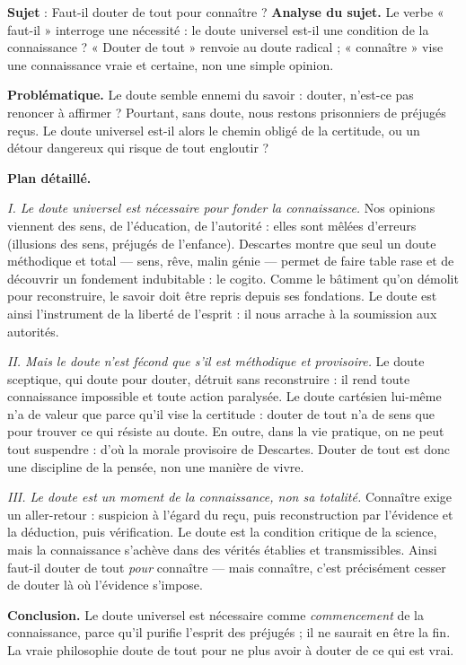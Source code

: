 \documentclass[11pt]{article}
\begin{document}
\begin{exoresolu}
\textbf{Sujet} : Faut-il douter de tout pour connaître ?
\tcblower
\textbf{Analyse du sujet.} Le verbe « faut-il » interroge une nécessité : le doute universel est-il une condition de la connaissance ? « Douter de tout » renvoie au doute radical ; « connaître » vise une connaissance vraie et certaine, non une simple opinion.

\textbf{Problématique.} Le doute semble ennemi du savoir : douter, n'est-ce pas renoncer à affirmer ? Pourtant, sans doute, nous restons prisonniers de préjugés reçus. Le doute universel est-il alors le chemin obligé de la certitude, ou un détour dangereux qui risque de tout engloutir ?

\textbf{Plan détaillé.}

\emph{I. Le doute universel est nécessaire pour fonder la connaissance.} Nos opinions viennent des sens, de l'éducation, de l'autorité : elles sont mêlées d'erreurs (illusions des sens, préjugés de l'enfance). Descartes montre que seul un doute méthodique et total — sens, rêve, malin génie — permet de faire table rase et de découvrir un fondement indubitable : le cogito. Comme le bâtiment qu'on démolit pour reconstruire, le savoir doit être repris depuis ses fondations. Le doute est ainsi l'instrument de la liberté de l'esprit : il nous arrache à la soumission aux autorités.

\emph{II. Mais le doute n'est fécond que s'il est méthodique et provisoire.} Le doute sceptique, qui doute pour douter, détruit sans reconstruire : il rend toute connaissance impossible et toute action paralysée. Le doute cartésien lui-même n'a de valeur que parce qu'il vise la certitude : douter de tout n'a de sens que pour trouver ce qui résiste au doute. En outre, dans la vie pratique, on ne peut tout suspendre : d'où la morale provisoire de Descartes. Douter de tout est donc une discipline de la pensée, non une manière de vivre.

\emph{III. Le doute est un moment de la connaissance, non sa totalité.} Connaître exige un aller-retour : suspicion à l'égard du reçu, puis reconstruction par l'évidence et la déduction, puis vérification. Le doute est la condition critique de la science, mais la connaissance s'achève dans des vérités établies et transmissibles. Ainsi faut-il douter de tout \emph{pour} connaître — mais connaître, c'est précisément cesser de douter là où l'évidence s'impose.

\textbf{Conclusion.} Le doute universel est nécessaire comme \emph{commencement} de la connaissance, parce qu'il purifie l'esprit des préjugés ; il ne saurait en être la fin. La vraie philosophie doute de tout pour ne plus avoir à douter de ce qui est vrai.
\end{exoresolu}
\end{document}
